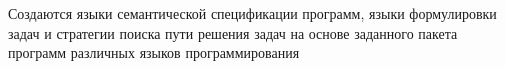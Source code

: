 \begin{scnsubstruct}
{\begin{scnitemize}
        \item Создаются языки семантической спецификации программ, языки формулировки задач и стратегии поиска пути решения задач на основе заданного пакета программ различных языков программирования
    \end{scnitemize}
    }
\end{scnsubstruct}